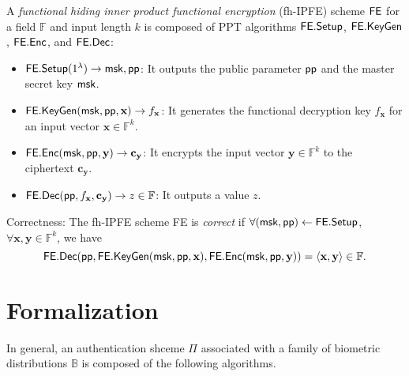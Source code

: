 \begin{definition}
\label{def:fh-IPFE}
	A \emph{functional hiding inner product functional encryption} (fh-IPFE) scheme $\sf FE$ for a field $\mathbb{F}$ and input length $k$ is composed of PPT algorithms ${\sf FE.Setup}$, ${\sf FE.KeyGen}$, ${\sf FE.Enc}$, and ${\sf FE.Dec}$:

	\begin{itemize}
	
		\item ${\sf FE.Setup}(1^\lambda) \to {\sf msk}, {\sf pp}$: It outputs the public parameter ${\sf pp}$ and the master secret key ${\sf msk}$.
	
		\item ${\sf FE.KeyGen}({\sf msk}, {\sf pp}, \mathbf{x}) \to f_\mathbf{x}$: It generates the functional decryption key $f_\mathbf{x}$ for an input vector $\mathbf{x} \in \mathbb{F}^k$. 
	
		\item ${\sf FE.Enc}({\sf msk}, {\sf pp}, \mathbf{y}) \to \mathbf{c_y}$: It encrypts the input vector $\mathbf{y} \in \mathbb{F}^k$ to the ciphertext $\mathbf{c_y}$. 
	
		\item ${\sf FE.Dec}({\sf pp}, f_\mathbf{x}, \mathbf{c_y}) \to z \in \mathbb{F}$: It outputs a value $z$.
	
	\end{itemize}
	
	\noindent Correctness: The fh-IPFE scheme {\sf FE} is \emph{correct} if $\forall ({\sf msk}, {\sf pp}) \gets {\sf FE.Setup}$, $\forall \mathbf{x}, \mathbf{y} \in \mathbb{F}^k$, we have
	\[
		{\sf FE.Dec}( {\sf pp}, {\sf FE.KeyGen}({\sf msk}, {\sf pp}, \mathbf{x}), {\sf FE.Enc}({\sf msk}, {\sf pp}, \mathbf{y}) ) = \langle \mathbf{x} , \mathbf{y} \rangle \in \mathbb{F}.
	\]

\end{definition}


\section{Formalization}
\label{sec:formalization}


In general, an authentication shceme $\Pi$ associated with a family of biometric distributions $\mathbb{B}$ is composed of the following algorithms.

